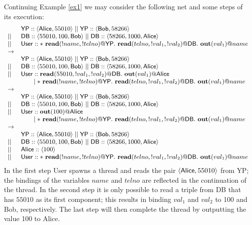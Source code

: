 \documentclass[a4paper]{llncs}
\newcommand{\netpar}{\mid\mid}
\begin{document}
\begin{example}\label{ex2}
Continuing Example \ref{ex1} we may consider the following net and some steps of
its execution:
$$\small
\begin{array}{ll}
& {\sf YP} :: \langle {\sf Alice}, 55010 \rangle \netpar 
  {\sf YP} :: \langle {\sf Bob}, 58266 \rangle\\
\netpar
& {\sf DB} :: \langle 55010, 100, {\sf Bob} \rangle \netpar 
  {\sf DB} :: \langle 58266, 1000, {\sf Alice} \rangle \\
\netpar
& {\sf User} :: *\ {\bf read}(!name,!telno)@{\sf YP}.\ 
 {\bf read}(telno,!val_1,!val_2)@{\sf DB}.\ {\bf out}(val_1)@{name}\\
\rightarrow\\
& {\sf YP} :: \langle {\sf Alice}, 55010 \rangle \netpar 
  {\sf YP} :: \langle {\sf Bob}, 58266 \rangle\\
\netpar
& {\sf DB} :: \langle 55010, 100, {\sf Bob} \rangle \netpar
  {\sf DB} :: \langle 58266, 1000, {\sf Alice} \rangle \\
\netpar
& {\sf User} :: {\bf read}(55010,!val_1,!val_2)@{\sf DB}.\ {\bf out}(val_1)@{\sf Alice}\\
& \qquad \mid *\ {\bf read}(!name,!telno)@{\sf YP}.\ 
 {\bf read}(telno,!val_1,!val_2)@{\sf DB}.\ {\bf out}(val_1)@{name}\\
\rightarrow\\
& {\sf YP} :: \langle {\sf Alice}, 55010 \rangle \netpar 
  {\sf YP} :: \langle {\sf Bob}, 58266 \rangle\\
\netpar
& {\sf DB} :: \langle 55010, 100, {\sf Bob} \rangle \netpar 
  {\sf DB} :: \langle 58266, 1000, {\sf Alice} \rangle \\
\netpar
& {\sf User} ::  {\bf out}(100)@{\sf Alice}\\
& \qquad \mid *\ {\bf read}(!name,!telno)@{\sf YP}.\ 
 {\bf read}(telno,!val_1,!val_2)@{\sf DB}.\ {\bf out}(val_1)@{name}\\
\rightarrow\\
& {\sf YP} :: \langle {\sf Alice}, 55010 \rangle \netpar
  {\sf YP} :: \langle {\sf Bob}, 58266 \rangle\\
\netpar
& {\sf DB} :: \langle 55010, 100, {\sf Bob} \rangle \netpar 
  {\sf DB} :: \langle 58266, 1000, {\sf Alice} \rangle \\
\netpar
& {\sf Alice} :: \langle 100 \rangle \\
\netpar
& {\sf User} ::  *\ {\bf read}(!name,!telno)@{\sf YP}.\ 
 {\bf read}(telno,!val_1,!val_2)@{\sf DB}.\ {\bf out}(val_1)@{name}\\
\end{array}
$$
In the first step {\sf User} spawns a thread and reads the pair
$\langle {\sf Alice}, 55010\rangle$ from {\sf YP}; the bindings of the
variables $name$ and $telno$ are reflected in the continuation of the
thread. In the second step it is only possible to read a triple from
{\sf DB} that has $55010$ as its first component; this results in
binding $val_1$ and $val_2$ to 100 and {\sf Bob}, respectively. The
last step will then complete the thread by outputting the value 100 to
{\sf Alice}.
\end{example}
\end{document}
